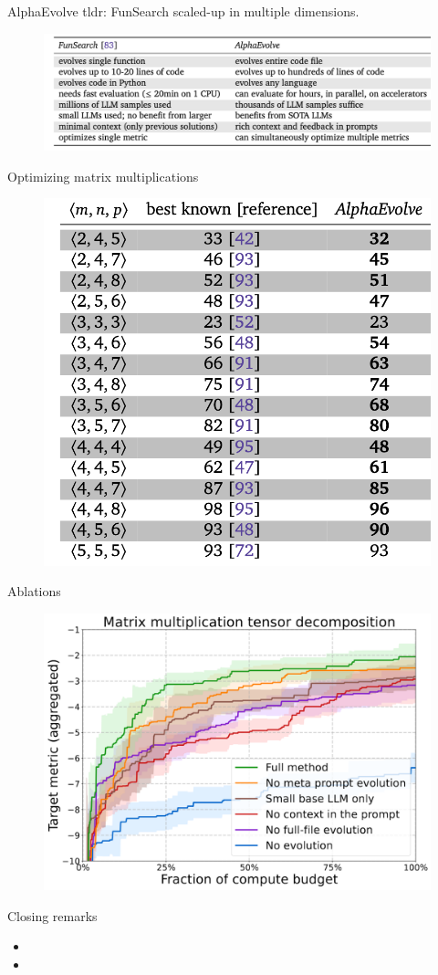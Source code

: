 \documentclass{beamer}
\begin{document}
\begin{frame}{AlphaEvolve}
tldr: FunSearch scaled-up in multiple dimensions. \\
\begin{figure}
\includegraphics[width=1\linewidth]{figures/funsearch-vs-alphaevolve.png}
\end{figure}
\end{frame}

\begin{frame}{Optimizing matrix multiplications}
\begin{figure}
\centering
\includegraphics[width=0.5\linewidth]{figures/matmul-table.png}
\end{figure}
\end{frame}

\begin{frame}{Ablations}
\begin{figure}
\centering
\includegraphics[width=0.8\linewidth]{figures/alphaevolve-ablations.png}
\end{figure}
\end{frame}

\begin{frame}{Closing remarks}
\begin{itemize}
\item
\item
\end{itemize}
\end{frame}
\end{document}
